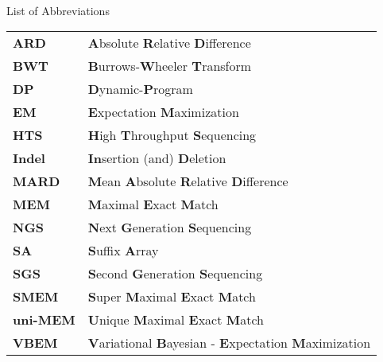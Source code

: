

\renewcommand{\baselinestretch}{1}
\small\normalsize
\hbox{\ }

\vspace{.5in}

\begin{center}
\large{List of Abbreviations}
\end{center} 

\vspace{3pt}

\begin{supertabular}{ll}


\textbf{ARD} & \textbf{A}bsolute  \textbf{R}elative \textbf{D}ifference\\
\textbf{BWT} & \textbf{B}urrows-\textbf{W}heeler \textbf{T}ransform\\
\textbf{DP} & \textbf{D}ynamic-\textbf{P}rogram\\
\textbf{EM} & \textbf{E}xpectation \textbf{M}aximization\\
\textbf{HTS} & \textbf{H}igh \textbf{T}hroughput \textbf{S}equencing\\
\textbf{Indel} & \textbf{In}sertion (and) \textbf{D}eletion\\
\textbf{MARD} & \textbf{M}ean \textbf{A}bsolute  \textbf{R}elative \textbf{D}ifference\\
\textbf{MEM} & \textbf{M}aximal \textbf{E}xact \textbf{M}atch\\
\textbf{NGS} & \textbf{N}ext \textbf{G}eneration \textbf{S}equencing\\
\textbf{SA} & \textbf{S}uffix \textbf{A}rray\\
\textbf{SGS} & \textbf{S}econd \textbf{G}eneration \textbf{S}equencing\\
\textbf{SMEM} & \textbf{S}uper \textbf{M}aximal \textbf{E}xact \textbf{M}atch\\
\textbf{uni-MEM} & \textbf{U}nique \textbf{M}aximal \textbf{E}xact \textbf{M}atch\\
\textbf{VBEM} & \textbf{V}ariational \textbf{B}ayesian - \textbf{E}xpectation \textbf{M}aximization\\
    

\end{supertabular}

